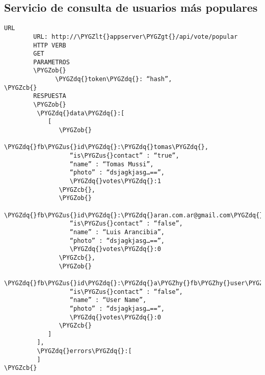 \documentclass[a4paper,10pt,spanish]{sphinxmanual}
\def\PYGZus{\char`\_}
\def\PYGZob{\char`\{}
\def\PYGZcb{\char`\}}
\def\PYGZlt{\char`\<}
\def\PYGZgt{\char`\>}
\def\PYGZhy{\char`\-}
\def\PYGZdq{\char`\"}
\begin{document}
\subsection{Servicio de consulta de usuarios más populares}
\label{apiRest:servicio-de-consulta-de-usuarios-mas-populares}
\begin{Verbatim}[commandchars=\\\{\}]
URL
        URL: http://\PYGZlt{}appserver\PYGZgt{}/api/vote/popular
        HTTP VERB
        GET
        PARAMETROS
        \PYGZob{}
              \PYGZdq{}token\PYGZdq{}: “hash”,
\PYGZcb{}
        RESPUESTA
        \PYGZob{}
         \PYGZdq{}data\PYGZdq{}:[
            [
               \PYGZob{}
                  \PYGZdq{}fb\PYGZus{}id\PYGZdq{}:\PYGZdq{}tomas\PYGZdq{},
                  “is\PYGZus{}contact” : “true”,
                  “name” : “Tomas Mussi”,
                  “photo” : “dsjagkjasg…==”,
                  \PYGZdq{}votes\PYGZdq{}:1
               \PYGZcb{},
               \PYGZob{}
                  \PYGZdq{}fb\PYGZus{}id\PYGZdq{}:\PYGZdq{}aran.com.ar@gmail.com\PYGZdq{},
                  “is\PYGZus{}contact” : “false”,
                  “name” : “Luis Arancibia”,
                  “photo” : “dsjagkjasg…==”,
                  \PYGZdq{}votes\PYGZdq{}:0
               \PYGZcb{},
               \PYGZob{}
                  \PYGZdq{}fb\PYGZus{}id\PYGZdq{}:\PYGZdq{}a\PYGZhy{}fb\PYGZhy{}user\PYGZhy{}id\PYGZdq{},
                  “is\PYGZus{}contact” : “false”,
                  “name” : “User Name”,
                  “photo” : “dsjagkjasg…==”,
                  \PYGZdq{}votes\PYGZdq{}:0
               \PYGZcb{}
            ]
         ],
         \PYGZdq{}errors\PYGZdq{}:[
         ]
\PYGZcb{}
\end{Verbatim}
\end{document}
